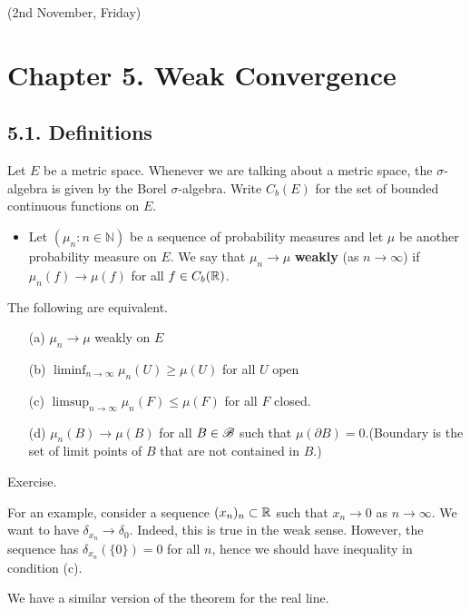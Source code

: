 \documentclass[12pt,a4paper]{report}
\newenvironment{proof}
{\begin{changemargin}{1cm}{0.5cm} 
	}%
	{\end{changemargin}
}
\begin{document}
\newday

(2nd November, Friday)

\section*{Chapter 5. Weak Convergence}

\subsection*{5.1. Definitions}

Let $E$ be a metric space. Whenever we are talking about a metric space, the $\sigma$-algebra is given by the Borel $\sigma$-algebra. Write $C_b(E)$ for the set of bounded continuous functions on $E$.
\begin{itemize}
\item Let $(\mu_n :n\in \mathbb{N})$ be a sequence of probability measures and let $\mu$ be another probability measure on $E$. We say that $\mu_n \rightarrow \mu$ \textbf{weakly} (as $n\rightarrow \infty$) if $\mu_n (f) \rightarrow \mu(f)$ for all $f\in C_b(\mathbb{R})$.
\end{itemize}
\s

 The following are equivalent.
\begin{itemize}
\item[(a)] $\mu_n \rightarrow \mu$ weakly on $E$
\item[(b)] $\liminf_{n\rightarrow \infty} \mu_n(U) \geq \mu(U)$ for all $U$ open
\item[(c)] $\limsup_{n\rightarrow \infty} \mu_n(F) \leq \mu(F)$ for all $F$ closed.
\item[(d)] $\mu_n(B) \rightarrow \mu(B)$ for all $B \in \mathscr{B}$ such that $\mu(\partial B)=0$.(Boundary is the set of limit points of $B$ that are not contained in $B$.)
\end{itemize}
\begin{proof}
\pf Exercise.
\end{proof}
\s

For an example, consider a sequence $(x_n)_n \subset \mathbb{R}$ such that $x_n \rightarrow 0$ as $n\rightarrow \infty$. We want to have $\delta_{x_n} \rightarrow \delta_0$. Indeed, this is true in the weak sense. However, the sequence has $\delta_{x_n}(\{0\}) =0$ for all $n$, hence we should have inequality in condition (c).
\s

We have a similar version of the theorem for the real line.
\s
\end{document}
